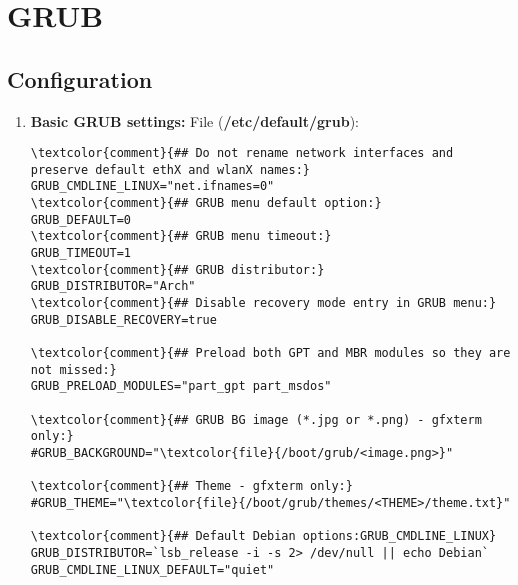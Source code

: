 \documentclass[10pt, a4paper, onecolumn, openany]{book} %
\begin{document}
\chapter{GRUB}
\section{Configuration}
\begin{enumerate}
    \item \textbf{Basic GRUB settings:}
\newline File (\textbf{\textcolor{file}{/etc/default/grub}}):
\begin{Verbatim}[commandchars=\\\{\}]
\textcolor{comment}{## Do not rename network interfaces and preserve default ethX and wlanX names:}
GRUB_CMDLINE_LINUX="net.ifnames=0"
\textcolor{comment}{## GRUB menu default option:}
GRUB_DEFAULT=0
\textcolor{comment}{## GRUB menu timeout:}
GRUB_TIMEOUT=1
\textcolor{comment}{## GRUB distributor:}
GRUB_DISTRIBUTOR="Arch"
\textcolor{comment}{## Disable recovery mode entry in GRUB menu:}
GRUB_DISABLE_RECOVERY=true

\textcolor{comment}{## Preload both GPT and MBR modules so they are not missed:}
GRUB_PRELOAD_MODULES="part_gpt part_msdos"

\textcolor{comment}{## GRUB BG image (*.jpg or *.png) - gfxterm only:}
#GRUB_BACKGROUND="\textcolor{file}{/boot/grub/<image.png>}"

\textcolor{comment}{## Theme - gfxterm only:}
#GRUB_THEME="\textcolor{file}{/boot/grub/themes/<THEME>/theme.txt}"

\textcolor{comment}{## Default Debian options:GRUB_CMDLINE_LINUX}
GRUB_DISTRIBUTOR=`lsb_release -i -s 2> /dev/null || echo Debian`
GRUB_CMDLINE_LINUX_DEFAULT="quiet"
\end{Verbatim}
\end{enumerate}
\end{document}
